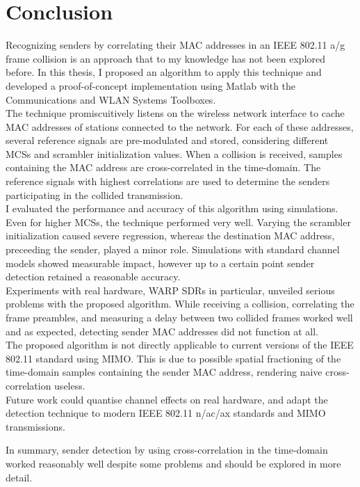 
\chapter{Conclusion}\label{ch:Conclusion}
\glsresetall %

Recognizing senders by correlating their MAC addresses in an IEEE 802.11 a/g frame collision is an approach that to my knowledge has not been explored before. In this thesis, I proposed an algorithm to apply this technique and developed a proof-of-concept implementation using Matlab with the Communications and WLAN Systems Toolboxes.\\

The technique promiscuitively listens on the wireless network interface to cache MAC addresses of stations connected to the network. For each of these addresses, several reference signals are pre-modulated and stored, considering different \glspl{MCS} and scrambler initialization values. When a collision is received, samples containing the MAC address are cross-correlated in the time-domain. The reference signals with highest correlations are used to determine the senders participating in the collided transmission.\\

I evaluated the performance and accuracy of this algorithm using simulations. Even for higher \glspl{MCS}, the technique performed very well. Varying the scrambler initialization caused severe regression, whereas the destination MAC address, preceeding the sender, played a minor role. Simulations with standard channel models showed measurable impact, however up to a certain point sender detection retained a reasonable accuracy.\\

Experiments with real hardware, \gls{WARP} \glspl{SDR} in particular, unveiled serious problems with the proposed algorithm. While receiving a collision, correlating the frame preambles, and measuring a delay between two collided frames worked well and as expected, detecting sender MAC addresses did not function at all.\\

The proposed algorithm is not directly applicable to current versions of the IEEE 802.11 standard using \gls{MIMO}. This is due to possible spatial fractioning of the time-domain samples containing the sender MAC address, rendering naive cross-correlation useless.\\

Future work could quantise channel effects on real hardware, and adapt the detection technique to modern IEEE 802.11 n/ac/ax standards and \gls{MIMO} transmissions.

In summary, sender detection by using cross-correlation in the time-domain worked reasonably well despite some problems and should be explored in more detail.
